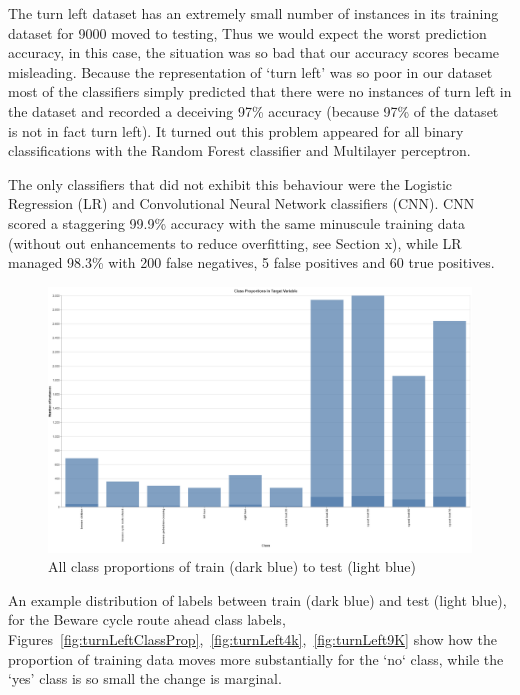 \documentclass[11pt]{article}
\begin{document}
The turn left dataset has an extremely small number of instances in its training dataset for 9000 moved to testing, Thus we would expect the worst prediction accuracy, in this case, the situation was so bad that our accuracy scores became misleading. Because the representation of ‘turn left’ was so poor in our dataset most of the classifiers simply predicted that there were no instances of turn left in the dataset and recorded a deceiving 97\% accuracy (because 97\% of the dataset is not in fact turn left). It turned out this problem appeared for all binary classifications with the Random Forest classifier and Multilayer perceptron.
\par
The only classifiers that did not exhibit this behaviour were the Logistic Regression (LR) and Convolutional Neural Network classifiers (CNN). CNN scored a staggering 99.9\% accuracy with the same minuscule training data (without out enhancements to reduce overfitting, see Section x), while LR managed 98.3\% with 200 false negatives, 5 false positives and 60 true positives.
\newline
\par
\begin{figure}[H]
  \caption {All class proportions of train (dark blue) to test (light blue)}
  \centering 
  \includegraphics[width = \textwidth, height = 0.5\textheight, keepaspectratio]{Images/classProportionsInTargetVariable.png}
\end{figure}
An example distribution of labels between train (dark blue) and test (light blue), for the Beware cycle route ahead class labels, Figures~\ref{fig:turnLeftClassProp},~\ref{fig:turnLeft4k},~\ref{fig:turnLeft9K} show how the proportion of training data moves more substantially for the `no` class, while the `yes' class is so small the change is marginal.
\end{document}
